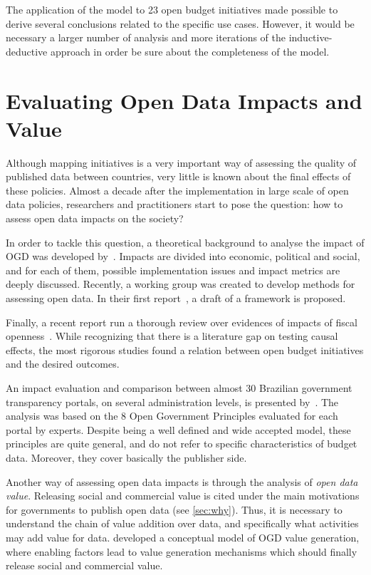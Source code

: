 The application of the model to 23 open budget initiatives made possible to derive several conclusions related to the specific use cases.
However, it would be necessary a larger number of analysis and more iterations of the inductive-deductive approach in order be sure about the completeness of the model.

\section{Evaluating Open Data Impacts and Value}
\label{sec:impacts}

Although mapping initiatives is a very important way of assessing the quality of published data between countries, very little is known about the final effects of these policies.
Almost a decade after the implementation in large scale of open data policies, researchers and practitioners start to pose the question: how to assess open data impacts on the society?

In order to tackle this question, a theoretical background to analyse the impact of OGD was developed by~. 
Impacts are divided into economic, political and social, and for each of them, possible implementation issues and impact metrics are deeply discussed.
Recently, a working group was created to develop methods for assessing open data. In their first report~\cite{Caplan2014}, a draft of a framework is proposed.

Finally, a recent report run a thorough review over evidences of impacts of fiscal openness~\cite{Renzio2015}. While recognizing that there is a literature gap on testing causal effects, the most rigorous studies found a relation between open budget initiatives and the desired outcomes.

An impact evaluation and comparison between almost 30 Brazilian government transparency portals, on several administration levels, is presented by~. The analysis was based on the 8 Open Government Principles evaluated for each portal by experts. Despite being a well defined and wide accepted model, these principles are quite general, and do not refer to specific characteristics of budget data. Moreover, they cover basically the publisher side.


Another way of assessing open data impacts is through the analysis of \emph{open data value}.
Releasing social and commercial value is cited under the main motivations for governments to publish open data (see \autoref{sec:why}).
Thus, it is necessary to understand the chain of value addition over data, and specifically what activities may add value for data.
 developed a conceptual model of OGD value generation, where enabling factors lead to value generation mechanisms which should finally release social and commercial value. 

